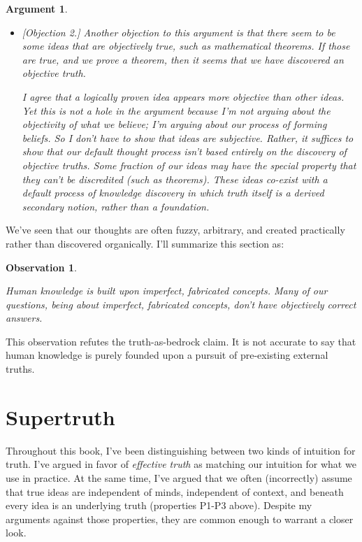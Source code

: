 \documentclass[9pt, twoside]{book}
\newtheorem{obs}{Observation}
\theoremstyle{argtstyle}
\newtheorem*{argt}{Argument}
\begin{document}
\begin{argt}
\begin{itemize}
    \item{} [Objection 2.]
        Another objection to this argument is that there seem to be some ideas
        that are objectively true, such as mathematical theorems. If
        those are true, and we prove a theorem, then it seems that we have
        discovered an objective truth.

        I agree that a logically proven idea appears more objective than other
        ideas.
        Yet this is not a hole in the argument because I'm not arguing about the
        objectivity of what we believe; I'm arguing about our process of forming
        beliefs.
        So I don't have to show that ideas are subjective.
        Rather, it suffices to show that our default thought process isn't based
        entirely on the discovery of objective truths.
        Some fraction of our
        ideas may have the special property that they can't be discredited
        (such as theorems).
        These ideas co-exist with a default process of knowledge discovery in
        which truth itself is a derived secondary notion, rather than a
        foundation.
\end{itemize}
\end{argt}

We've seen that our thoughts are often fuzzy, arbitrary, and created practically
rather than discovered organically. I'll summarize this section as:
\newcommand{\obsnine}{
Human knowledge is
built upon imperfect, fabricated concepts.
Many of our questions, being about imperfect,
fabricated concepts,
don't have objectively correct answers.
}
\begin{obs}\label{o9}
    \obsnine
\end{obs}

This observation refutes the truth-as-bedrock claim.
It is not accurate to say that human knowledge is purely founded upon a
pursuit of pre-existing external truths.

\section{Supertruth}\label{supertruth}


Throughout this book, I've been distinguishing between two kinds of intuition
for truth.
I've argued in favor of {\em effective truth} as matching our intuition for what
we use in practice.
At the same time, I've argued that we often (incorrectly) assume that true ideas
are independent of minds, independent of context, and beneath every idea
is an underlying truth (properties P1-P3 above).
Despite my arguments against those properties, they are common enough to warrant
a closer look.
\end{document}
